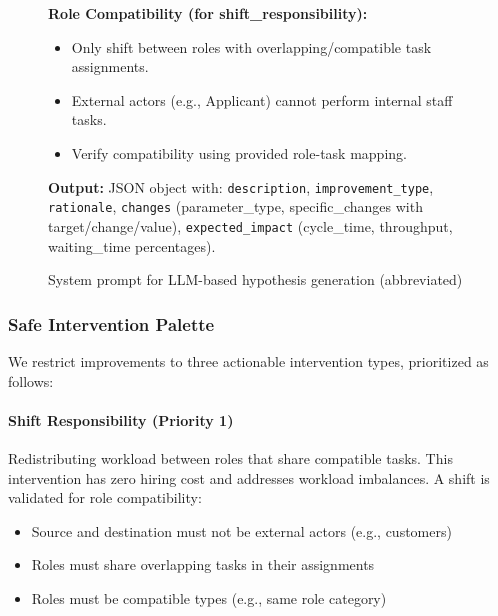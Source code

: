 \documentclass[preprint,12pt]{elsarticle}
\begin{document}
\begin{figure}[!t]
\begin{tcolorbox}[
    title=System Prompt: Hypothesis Generation,
    colframe=black!80,
    fonttitle=\bfseries,
    boxsep=2pt, left=5pt, right=5pt, top=1mm, bottom=1mm,
    toptitle=0.5mm, bottomtitle=0.5mm
]
\begin{tcolorbox}[colback=rulecolor, colframe=white, boxrule=0pt,
        size=fbox, arc=0mm,
        before skip=0pt, after skip=1pt]
        \textbf{Role Compatibility (for shift\_responsibility):}
        \begin{itemize}[nosep, leftmargin=*, labelsep=1.5pt]
            \item Only shift between roles with overlapping/compatible task assignments.
            \item External actors (e.g., Applicant) cannot perform internal staff tasks.
            \item Verify compatibility using provided role-task mapping.
        \end{itemize}
    \end{tcolorbox}

    \begin{tcolorbox}[colback=outputcolor, colframe=white, boxrule=0pt,
        size=fbox, arc=0mm,
        before skip=0pt, after skip=0pt]
        \textbf{Output:} JSON object with: \texttt{description}, \texttt{improvement\_type}, \texttt{rationale}, \texttt{changes} (parameter\_type, specific\_changes with target/change/value), \texttt{expected\_impact} (cycle\_time, throughput, waiting\_time percentages).
    \end{tcolorbox}
\end{tcolorbox}
\caption{System prompt for LLM-based hypothesis generation (abbreviated)}
\label{fig:prompt}
\end{figure}

\subsubsection{Safe Intervention Palette}

We restrict improvements to three actionable intervention types, prioritized as follows:

\paragraph{Shift Responsibility (Priority 1)}
Redistributing workload between roles that share compatible tasks. This intervention has zero hiring cost and addresses workload imbalances. A shift is validated for role compatibility:
\begin{itemize}
    \item Source and destination must not be external actors (e.g., customers)
    \item Roles must share overlapping tasks in their assignments
    \item Roles must be compatible types (e.g., same role category)
\end{itemize}
\end{document}
